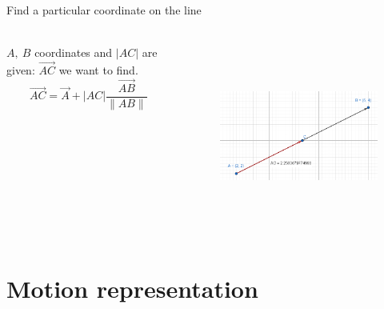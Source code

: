 \documentclass[aspectratio=169,xcolor=table,10pt, notes=hide]{beamer}
\begin{document}
    \begin{frame}[t]{Find a particular coordinate on the line}
    \framesubtitle{}
        \begin{columns}[c,onlytextwidth]
            \begin{column}{0.39\textwidth}
                $A,\ B$ coordinates and $|AC|$ are given: $\vec{AC}$ we want to find.
                $$\vec{AC} = \vec{A} + |AC|\frac{\vec{AB}}{\|AB\|}$$
            \end{column}
            \begin{column}{0.59\textwidth}
                \begin{figure}[H]
                    \centering\includegraphics[height=6cm,width=1\textwidth,keepaspectratio]{exx.png}
                \end{figure}
            \end{column}
        \end{columns}
    \end{frame}

\section*{Motion representation}
\end{document}
